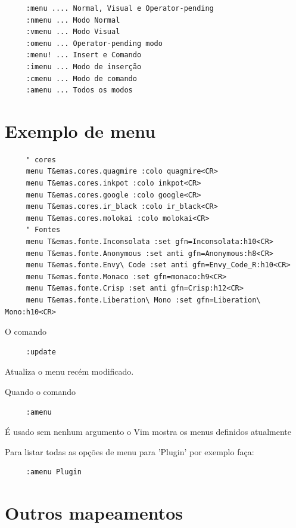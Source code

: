 \documentclass[10pt,a4paper,openany]{book}
\begin{document}
\begin{verbatim}
     :menu .... Normal, Visual e Operator-pending
     :nmenu ... Modo Normal
     :vmenu ... Modo Visual
     :omenu ... Operator-pending modo
     :menu! ... Insert e Comando
     :imenu ... Modo de inserção
     :cmenu ... Modo de comando
     :amenu ... Todos os modos
\end{verbatim}

\section{Exemplo de menu}
\label{Exemplo de menu}

\begin{verbatim}
     " cores
     menu T&emas.cores.quagmire :colo quagmire<CR>
     menu T&emas.cores.inkpot :colo inkpot<CR>
     menu T&emas.cores.google :colo google<CR>
     menu T&emas.cores.ir_black :colo ir_black<CR>
     menu T&emas.cores.molokai :colo molokai<CR>
     " Fontes
     menu T&emas.fonte.Inconsolata :set gfn=Inconsolata:h10<CR>
     menu T&emas.fonte.Anonymous :set anti gfn=Anonymous:h8<CR>
     menu T&emas.fonte.Envy\ Code :set anti gfn=Envy_Code_R:h10<CR>
     menu T&emas.fonte.Monaco :set gfn=monaco:h9<CR>
     menu T&emas.fonte.Crisp :set anti gfn=Crisp:h12<CR>
     menu T&emas.fonte.Liberation\ Mono :set gfn=Liberation\ Mono:h10<CR>
\end{verbatim}

O comando

\begin{verbatim}
     :update
\end{verbatim}

Atualiza o menu recém modificado.

Quando o comando

\begin{verbatim}
     :amenu
\end{verbatim}

É usado sem nenhum argumento o Vim mostra os menus definidos atualmente

Para listar todas as opções de menu para 'Plugin' por exemplo faça:

\begin{verbatim}
     :amenu Plugin
\end{verbatim}

\section{Outros mapeamentos}
\label{Outros mapeamentos}
\end{document}
